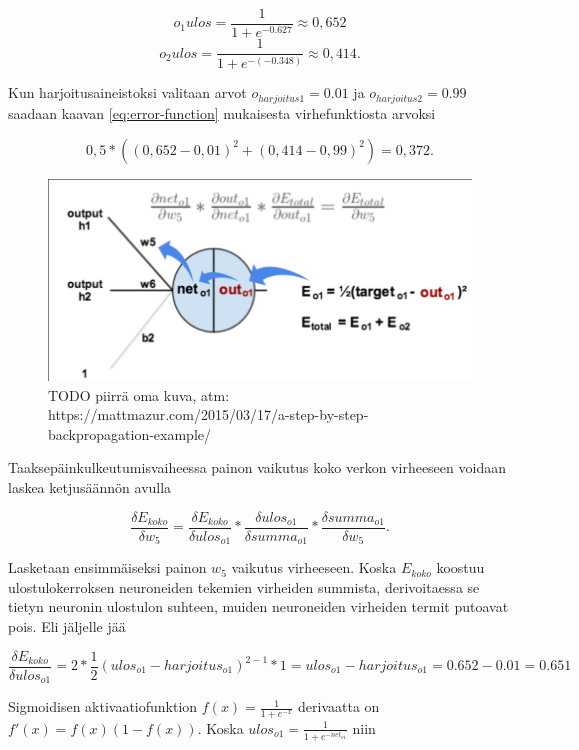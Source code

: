 \documentclass[finnish]{tktltiki2}
\theoremstyle{definition}
\theoremstyle{remark}
\begin{document}
  $$o_{1}ulos = \frac{1}{1 + e^{-0.627}} \approx 0,652$$
  $$o_{2}ulos = \frac{1}{1 + e^{-(-0.348)}} \approx 0,414.$$

  Kun harjoitusaineistoksi valitaan arvot $o_{harjoitus1} = 0.01$ ja $o_{harjoitus2} = 0.99$ saadaan kaavan \ref{eq:error-function} mukaisesta virhefunktiosta arvoksi

  $$ 0,5 * ( (0,652 - 0,01)^2 + (0,414 - 0,99)^2 ) = 0,372. $$
  
    \begin{figure}[h]
    \centering
    \includegraphics[scale=0.4]{chain-rule}
    \caption{TODO piirrä oma kuva, atm: https://mattmazur.com/2015/03/17/a-step-by-step-backpropagation-example/}
    \label{pic:chain-rule}
    \end{figure}

  Taaksepäinkulkeutumisvaiheessa painon vaikutus koko verkon virheeseen voidaan laskea ketjusäännön avulla

  $$ \frac{\delta E_{koko}}{\delta w_5} = \frac{\delta E_{koko}}{\delta ulos_{o1}} * \frac{\delta ulos_{o1}}{\delta summa_{o1}} * \frac{\delta summa_{o1}}{\delta w_5}. $$

  Lasketaan ensimmäiseksi painon $w_5$ vaikutus virheeseen. Koska $E_{koko}$ koostuu ulostulokerroksen neuroneiden tekemien virheiden summista, derivoitaessa se tietyn neuronin ulostulon suhteen, muiden neuroneiden virheiden termit putoavat pois. Eli jäljelle jää 
  
  $$ \frac{\delta E_{koko}}{\delta ulos_{o1}} = 2 * \frac{1}{2} (ulos_{o1} - harjoitus_{o1})^{2-1} * 1 = ulos_{o1} - harjoitus_{o1} = 0.652 - 0.01 = 0.651$$

  Sigmoidisen aktivaatiofunktion $ f(x) = \frac{1}{1 + e^{-x}}$ derivaatta on $f'(x) = f(x)(1 - f(x))$.
  Koska $ ulos_{o1} = \frac{1}{1+e^{-net_{o1}}} $ niin
\end{document}
